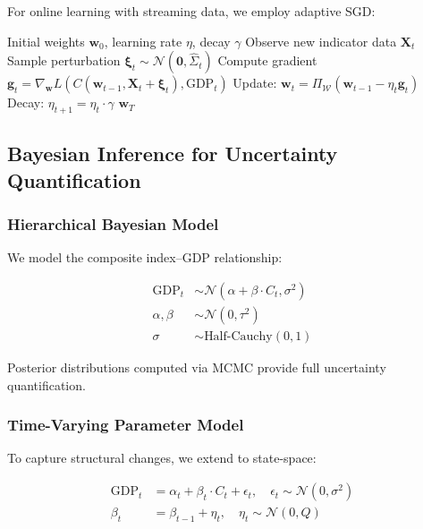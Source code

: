 \documentclass[12pt,a4paper]{article}
\begin{document}
For online learning with streaming data, we employ adaptive SGD:

\begin{algorithm}[htbp]
\caption{Adaptive Composite Index Optimization}
\label{alg:adaptive_sgd}
\begin{algorithmic}[1]
\Require Initial weights $\mathbf{w}_0$, learning rate $\eta$, decay $\gamma$
    \State Observe new indicator data $\mathbf{X}_t$
    \State Sample perturbation $\boldsymbol{\xi}_t \sim \mathcal{N}(\mathbf{0}, \hat{\Sigma}_t)$
    \State Compute gradient $\mathbf{g}_t = \nabla_{\mathbf{w}} L(C(\mathbf{w}_{t-1}, \mathbf{X}_t + \boldsymbol{\xi}_t), \text{GDP}_t)$
    \State Update: $\mathbf{w}_t = \Pi_{\mathcal{W}}\left(\mathbf{w}_{t-1} - \eta_t \mathbf{g}_t\right)$
    \State Decay: $\eta_{t+1} = \eta_t \cdot \gamma$
\EndFor
\State \Return $\mathbf{w}_T$
\end{algorithmic}
\end{algorithm}

\subsection{Bayesian Inference for Uncertainty Quantification}

\subsubsection{Hierarchical Bayesian Model}

We model the composite index--GDP relationship:

\begin{align}
    \text{GDP}_t &\sim \mathcal{N}(\alpha + \beta \cdot C_t, \sigma^2) \label{eq:likelihood} \\
    \alpha, \beta &\sim \mathcal{N}(0, \tau^2) \label{eq:prior_coef} \\
    \sigma &\sim \text{Half-Cauchy}(0, 1) \label{eq:prior_sigma}
\end{align}

Posterior distributions computed via MCMC provide full uncertainty quantification.

\subsubsection{Time-Varying Parameter Model}

To capture structural changes, we extend to state-space:

\begin{align}
    \text{GDP}_t &= \alpha_t + \beta_t \cdot C_t + \epsilon_t, \quad \epsilon_t \sim \mathcal{N}(0, \sigma^2) \\
    \beta_t &= \beta_{t-1} + \eta_t, \quad \eta_t \sim \mathcal{N}(0, Q)
\end{align}
\end{document}
